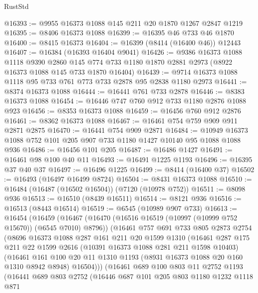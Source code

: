 \begin{lexlean}{RustStd}
\begin{coremodule}
@16393 := @9955 @16373 @1088 @145 @211 @20 @1870 @1267 @2847 @1219
@16395 := @8406 @16373 @1088
@16399 := @16395 @46 @733 @46 @1870
@16400 := @8415 @16373
@16404 := @16399 (@8414 (@16400 @46)) @12443
@16407 := @16384 (@16393 @16404 @9041)
@16426 := @9386
    @16373
    @1088
    @1118
    @9390
    @2860
    @145
    @774
    @733
    @1180
    @1870
    @2881
    @2973
    (@8922 @16373 @1088 @145 @733 @1870 @16404)
@16439 := @9714 @16373 @1088 @1118 @95 @733 @761 @773 @733 @2878 @95 @2838 @1180 @2973
@16441 := @8374 @16373 @1088
@16444 := @16441 @761 @733 @2878
@16446 := @8383 @16373 @1088
@16454 := @16446 @747 @760 @912 @733 @1180 @2876 @1088 @923
@16456 := @8353 @16373 @1088
@16459 := @16456 @760 @912 @2876
@16461 := @8362 @16373 @1088
@16467 := @16461 @754 @759 @909 @911 @2871 @2875
@16470 := @16441 @754 @909 @2871
@16484 := @10949 @16373 @1088 @752 @101 @205 @907 @733 @1180 @1427 @10140 @95 @1088 @1088 @936
@16486 := @16456 @101 @205
@16487 := @16486 @1427
@16491 := @16461 @98 @100 @40 @11
@16493 := @16491 @1225 @1193
@16496 := @16395 @37 @40 @37
@16497 := @16496 @1225
@16499 := @8414 (@16400 @37)
@16502 := @16493 (@16497 @16499 @8724)
@16504 := @8431 @16373 @1088
@16510 := @16484 (@16487 (@16502 @16504)) (@7120 (@10978 @752))
@16511 := @8098 @936
@16513 := @16510 (@8439 @16511)
@16514 := @8121 @936
@16516 := @16513 (@8443 @16514)
@16519 := @6545 (@10989 @907 @733)
@16613 := @16454
    (@16459
      (@16467
        (@16470 (@16516 @16519 (@10997 (@10999 @752 @15670)) (@6545 @7010) @8796))
        (@16461
          @757
          @691
          @733
          @805
          @2873
          @2754
          (@8696
            @16373
            @1088
            @287
            @161
            @211
            @20
            @1599
            @1310
            (@16461
              @287
              @175
              @211
              @22
              @1599
              @2616
              (@10391 @16373 @1088 @281 @211 @1598 @10403)
              (@16461
                @161
                @100
                @20
                @11
                @1310
                @1193
                (@8931 @16373 @1088 @20 @160 @1310 @8942 @8948)
                @16504)))
          (@16461
            @689
            @100
            @803
            @11
            @2752
            @1193
            (@16441
              @689
              @803
              @2752
              (@16446
                @687
                @101
                @205
                @803
                @1180
                @1232
                @1118
                @871

\end{coremodule}
\end{lexlean}
